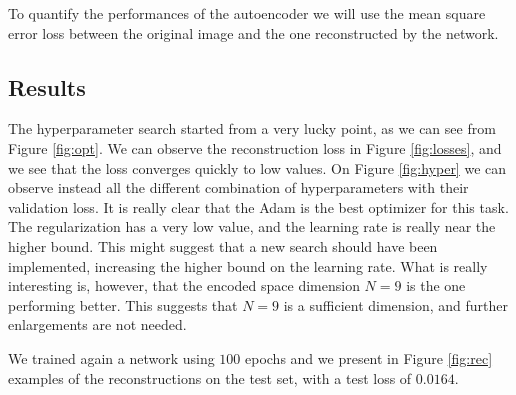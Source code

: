 To quantify the performances of the autoencoder we will use the mean square error loss between the original image and the one reconstructed by the network.

\subsection{Results}
The hyperparameter search started from a very lucky point, as we can see from Figure \ref{fig:opt}. 
We can observe the reconstruction loss in Figure \ref{fig:losses}, and we see that the loss converges quickly to low values. On Figure \ref{fig:hyper}
we can observe instead all the different combination of hyperparameters with their validation loss. It is really clear that the Adam is the best 
optimizer for this task. The regularization has a very low value, and the learning rate is really near the higher bound. This might suggest that a new 
search should have been implemented, increasing the higher bound on the learning rate. What is really interesting is, however, that the encoded space 
dimension $N=9$ is the one performing better. This suggests that $N=9$ is a sufficient dimension, and further enlargements are not needed.

We trained again a network using $100$ epochs and we present in Figure \ref{fig:rec} examples of the reconstructions on the test set, with a test loss
of $0.0164$.